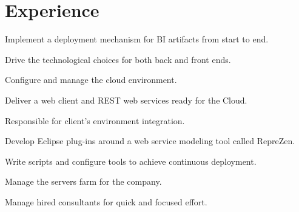 \documentclass[letterpaper]{deedy-resume} %
\begin{document}
\begin{minipage}[t]{0.66\textwidth} %


\section{Experience}


\vspace{\topsep} %
\begin{tightitemize}
\item Implement a deployment mechanism for BI artifacts from start to end.
\item Drive the technological choices for both back and front ends.
\item Configure and manage the cloud environment.
\item Deliver a web client and REST web services ready for the Cloud.
\end{tightitemize}

\sectionspace %



\begin{tightitemize}
\item Responsible for client's environment integration.
\item Develop Eclipse plug-ins around a web service modeling tool called RepreZen.
\item Write scripts and configure tools to achieve continuous deployment.
\item Manage the servers farm for the company.
\item Manage hired consultants for quick and focused effort.
\end{tightitemize}

\sectionspace %



\end{minipage}
\end{document}
